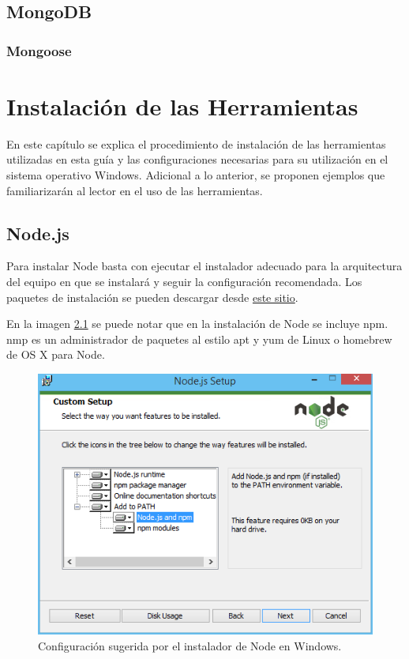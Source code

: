 \documentclass[10pt,a4paper]{report}
\begin{document}
\section{MongoDB}

\subsection{Mongoose}


\chapter{Instalación de las Herramientas}

En este capítulo se explica el procedimiento de instalación de las herramientas utilizadas en esta guía y las configuraciones necesarias para su utilización en el sistema operativo Windows. Adicional a lo anterior, se proponen ejemplos que familiarizarán al lector en el uso de las herramientas.

\section{Node.js}

Para instalar Node basta con ejecutar el instalador adecuado para la arquitectura del equipo en que se instalará y seguir la configuración recomendada. Los paquetes de instalación se pueden descargar desde \href{https://nodejs.org/en/download/}{este sitio}.

En la imagen \ref{fig:node-installation} se puede notar que en la instalación de Node se incluye npm. nmp es un administrador de paquetes al estilo apt y yum de Linux o homebrew de OS X para Node.

\begin{figure}[h!]
	\centering
	\includegraphics[scale=0.65]{images/node-installation}
	\caption{Configuración sugerida por el instalador de Node en Windows.}\label{fig:node-installation}
\end{figure}
\end{document}

